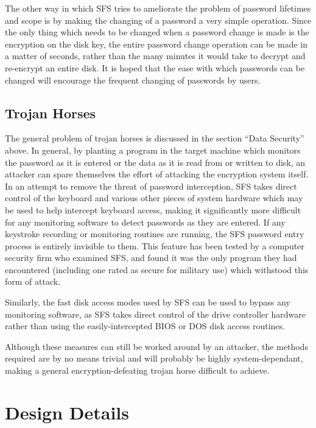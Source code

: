 The other way in which SFS tries to ameliorate the problem of password
lifetimes and scope is by making the changing of a password a very simple
operation.  Since the only thing which needs to be changed when a password
change is made is the encryption on the disk key, the entire password change 
operation can be made in a matter of seconds, rather than the many minutes it 
would take to decrypt and re-encrypt an entire disk.  It is hoped that the ease 
with which passwords can be changed will encourage the frequent changing of 
passwords by users.


\subsection{Trojan Horses}

The general problem of trojan horses is discussed in the section ``Data
Security'' above.  In general, by planting a program in the target machine which
monitors the password as it is entered or the data as it is read from or
written to disk, an attacker can spare themselves the effort of attacking the
encryption system itself.  In an attempt to remove the threat of password
interception, SFS takes direct control of the keyboard and various other pieces
of system hardware which may be used to help intercept keyboard access, making
it significantly more difficult for any monitoring software to detect passwords
as they are entered.  If any keystroke recording or monitoring routines are
running, the SFS password entry process is entirely invisible to them.  This
feature has been tested by a computer security firm who examined SFS, and found
it was the only program they had encountered (including one rated as secure for
military use) which withstood this form of attack.

Similarly, the fast disk access modes used by SFS can be used to bypass any
monitoring software, as SFS takes direct control of the drive controller
hardware rather than using the easily-intercepted BIOS or DOS disk access
routines.

Although these measures can still be worked around by an attacker, the methods
required are by no means trivial and will probably be highly system-dependant,
making a general encryption-defeating trojan horse difficult to achieve.


\section{Design Details}


